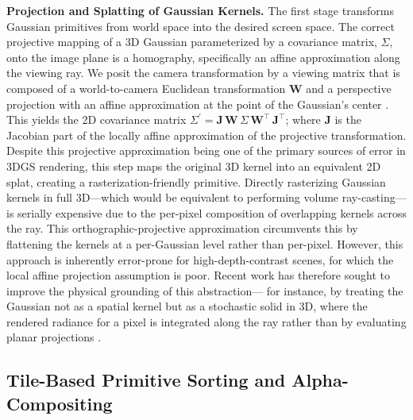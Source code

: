 \documentclass[11pt,a4paper]{article}
\begin{document}
\textbf{Projection and Splatting of Gaussian Kernels.} The first stage transforms Gaussian primitives from world space into the desired screen space. The correct projective mapping of a 3D Gaussian parameterized by a covariance matrix, \(\Sigma\), onto the image plane is a homography, specifically an affine approximation along the viewing ray. We posit the camera transformation by a viewing matrix that is composed of a world-to-camera Euclidean transformation \(\mathbf{W}\) and a perspective projection with an affine approximation at the point of the Gaussian's center \cite{arxiv:2403.14244v1}. This yields the 2D covariance matrix \(\Sigma^{\prime} = \mathbf{J}\,\mathbf{W}\,\Sigma\,\mathbf{W}^{\intercal}\,\mathbf{J}^{\intercal}\); where \(\mathbf{J}\) is the Jacobian part of the locally affine approximation of the projective transformation. Despite this projective approximation being one of the primary sources of error in 3DGS rendering, this step maps the original 3D kernel into an equivalent 2D splat, creating a rasterization-friendly primitive. Directly rasterizing Gaussian kernels in full 3D---which would be equivalent to performing volume ray-casting---is serially expensive due to the per-pixel composition of overlapping kernels across the ray. This orthographic-projective approximation circumvents this by flattening the kernels at a per-Gaussian level rather than per-pixel. However, this approach is inherently error-prone for high-depth-contrast scenes, for which the local affine projection assumption is poor. Recent work has therefore sought to improve the physical grounding of this abstraction--- for instance, by treating the Gaussian not as a spatial kernel but as a stochastic solid in 3D, where the rendered radiance for a pixel is integrated along the ray rather than by evaluating planar projections \cite{arxiv:2601.17835v2,arxiv:2312.13729v3}.


\subsection{Tile-Based Primitive Sorting and Alpha-Compositing}
\end{document}
